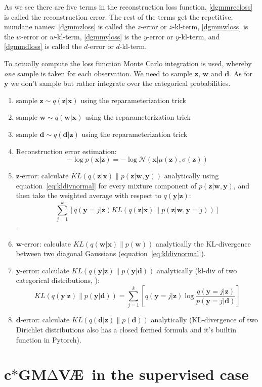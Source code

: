 \documentclass[11pt, a4paper]{report}
\theoremstyle{plain}
\theoremstyle{definition}
\theoremstyle{remark}
\newcommand{\x}{\mathbf{x}}
\newcommand{\z}{\mathbf{z}}
\newcommand{\y}{\mathbf{y}}
\newcommand{\w}{\mathbf{w}}
\newcommand{\dd}{\mathbf{d}}
\newcommand{\NN}{\mathcal{N}}
\newcommand{\gmvae}{c$\ast$GM$\mathrm{\Delta}$V\AE~}
\begin{document}
As we see there are five terms in the reconstruction loss function.
\ref{dgmmrecloss} is called the reconstruction error.
The rest of the terms get the repetitive, mundane names:
\ref{dgmmzloss} is called the $z$-error or $z$-kl-term,
\ref{dgmmwloss} is the $w$-error or $w$-kl-term,
\ref{dgmmyloss} is the $y$-error or $y$-kl-term, and
\ref{dgmmdloss} is called the $d$-error or $d$-kl-term.

To actually compute the loss function Monte Carlo integration is used,
whereby \emph{one} sample is taken for each observation.
We need to sample $\z$, $\w$ and $\dd$. As for $\y$ we don't sample but
rather integrate over the categorical probabilities.


\begin{enumerate}
\item{sample} $\z \sim q(\z | \x)$ using the reparameterization trick
\item{sample} $\w \sim q(\w | \x)$ using the reparameterization trick
\item{sample} $\dd \sim q(\dd | \z)$ using the reparameterization trick
\item{Reconstruction error estimation}:
$$-\log p(\x | \z) = -\log \NN(\x | \mu(\z), \sigma(\z))$$
\item{$\z$-error}: calculate $KL(q(\z | \x) \| p(\z | \w, \y))$ analytically
using equation~\ref{eq:kldivnormal}
for every mixture component of $p(\z | \w, \y)$,
and then take the weighted average with respect
to $q(\y | \z)$:
$$\sum_{j=1}^k [ q(\y=j | \z) KL(q(\z | \x) \| p(\z | \w, \y=j))]$$.
\item{$\w$-error}: calculate $KL(q(\w | \x) \| p(\w))$ analytically 
the KL-divergence between two diagonal Gaussians (equation~\ref{eq:kldivnormal}).
\item{$\y$-error}:
calculate $KL(q(\y | \z) \| p(\y | \dd))$ analytically (kl-div of
two categorical distributions, ):
$$KL(q(\y | \z) \| p(\y | \dd)) = 
\sum_{j=1}^k [ q(\y=j | \z) \log \frac{q(\y=j | \z)}{p(\y = j | \dd)}]$$
\item{$\dd$-error}:
calculate $KL(q(\dd | \z) \| p(\dd))$ analytically
(KL-divergence of two Dirichlet distributions also has a closed formed
formula and it's builtin function in Pytorch).
\end{enumerate}

\section{\gmvae in the supervised case}
\end{document}
